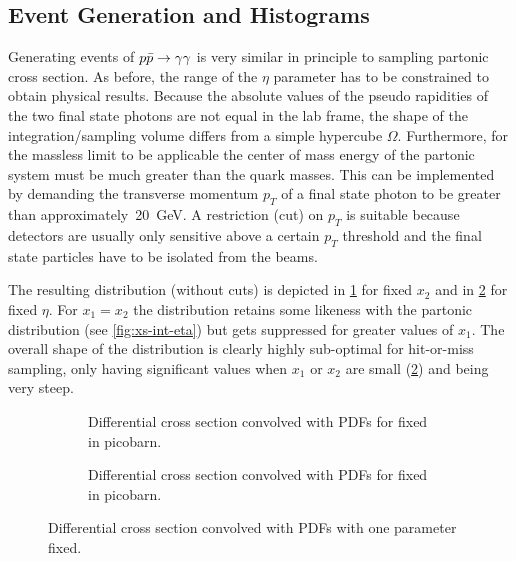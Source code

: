 \subsection{Event Generation and Histograms}%
\label{sec:ppevents}

Generating events of \(p\bar{p}\rightarrow\gamma\gamma\) is very similar in principle to
sampling partonic cross section. As before, the range of the \(\eta\)
parameter has to be constrained to obtain physical results. Because
the absolute values of the pseudo rapidities of the two final state
photons are not equal in the lab frame, the shape of the
integration/sampling volume differs from a simple hypercube
\(\Omega\). Furthermore, for the massless limit to be applicable the
center of mass energy of the partonic system must be much greater than
the quark masses. This can be implemented by demanding the transverse
momentum \(p_T\) of a final state photon to be greater than
approximately~\SI{20}{\giga\electronvolt}. A restriction (cut) on
\(p_T\) is suitable because detectors are usually only sensitive above
a certain \(p_T\) threshold and the final state particles have to be
isolated from the beams.

The resulting distribution (without cuts) is depicted in
\cref{fig:dist-pdf} for fixed \(x_2\) and in
\cref{fig:dist-pdf-fixed-eta} for fixed \(\eta\). For \(x_1 = x_2\)
the distribution retains some likeness with the partonic distribution
(see \cref{fig:xs-int-eta}) but gets suppressed for greater values of
\(x_1\). The overall shape of the distribution is clearly highly
sub-optimal for hit-or-miss sampling, only having significant values
when \(x_1\) or \(x_2\) are small (\cref{fig:dist-pdf-fixed-eta}) and
being very steep.

\begin{figure}[ht]
  \centering
  \begin{subfigure}{1\textwidth}
    \centering {}
    \caption{\label{fig:dist-pdf}Differential cross section convolved
      with PDFs for fixed \protect {} in
      picobarn.}
  \end{subfigure}

  \begin{subfigure}{1\textwidth}
    \centering {}
    \caption{\label{fig:dist-pdf-fixed-eta}Differential cross section
      convolved with PDFs for fixed \protect
       in picobarn.}
  \end{subfigure}
  \caption{\label{fig:dist-pdf-3d}Differential cross section
    convolved with PDFs with one parameter fixed.}
\end{figure}


